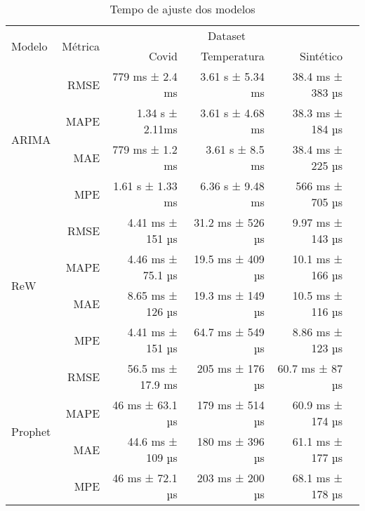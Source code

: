 \begin{table}[!htp]\centering
    \caption{Tempo de ajuste dos modelos}
    \begin{tabular}{lrrrrr}\toprule
    \multirow{2}{*}{Modelo} &\multirow{2}{*}{Métrica} &\multicolumn{3}{c}{Dataset} \\\cmidrule{3-5}
    & &Covid &Temperatura &Sintético \\\midrule
    \multirow{4}{*}{ARIMA} &RMSE &779 ms ± 2.4 ms &3.61 s ± 5.34 ms &38.4 ms ± 383 µs \\
    &MAPE &1.34 s ± 2.11ms &3.61 s ± 4.68 ms &38.3 ms ± 184 µs \\
    &MAE &779 ms ± 1.2 ms &3.61 s ± 8.5 ms &38.4 ms ± 225 µs \\
    &MPE &1.61 s ± 1.33 ms &6.36 s ± 9.48 ms &566 ms ± 705 µs \\\midrule
    \multirow{4}{*}{ReW} &RMSE &4.41 ms ± 151 µs &31.2 ms ± 526 µs &9.97 ms ± 143 µs \\
    &MAPE &4.46 ms ± 75.1 µs &19.5 ms ± 409 µs &10.1 ms ± 166 µs \\
    &MAE &8.65 ms ± 126 µs &19.3 ms ± 149 µs &10.5 ms ± 116 µs \\
    &MPE &4.41 ms ± 151 µs &64.7 ms ± 549 µs &8.86 ms ± 123 µs \\\midrule
    \multirow{4}{*}{Prophet} &RMSE &56.5 ms ± 17.9 ms &205 ms ± 176 µs &60.7 ms ± 87 µs \\
    &MAPE &46 ms ± 63.1 µs &179 ms ± 514 µs &60.9 ms ± 174 µs \\
    &MAE &44.6 ms ± 109 µs &180 ms ± 396 µs &61.1 ms ± 177 µs \\
    &MPE &46 ms ± 72.1 µs &203 ms ± 200 µs &68.1 ms ± 178 µs \\
    \bottomrule
    \end{tabular}
\end{table}

